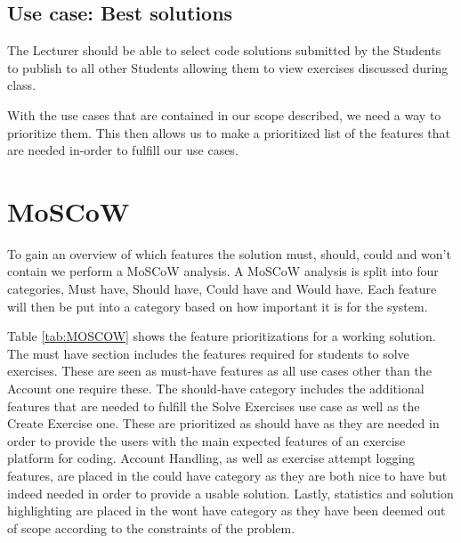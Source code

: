 \subsection*{Use case: Best solutions} 
The Lecturer should be able to select code solutions submitted by the Students to publish to all other Students allowing them to view exercises discussed during class.

With the use cases that are contained in our scope described, we need a way to prioritize them. This then allows us to make a prioritized list of the features that are needed in-order to fulfill our use cases. 

\section{MoSCoW}
To gain an overview of which features the solution must, should, could and won't contain we perform a MoSCoW analysis.
A MoSCoW analysis is split into four categories, Must have, Should have, Could have and Would have. Each feature will then be put into a category based on how important it is for the system. 

Table \ref{tab:MOSCOW} shows the feature prioritizations for a working solution. 
The must have section includes the features required for students to solve exercises. These are seen as must-have features as all use cases other than the Account one require these.  
The should-have category includes the additional features that are needed to fulfill the Solve Exercises use case as well as the Create Exercise one. 
These are prioritized as should have as they are needed in order to provide the users with the main expected features of an exercise platform for coding. 
Account Handling, as well as exercise attempt logging features, are placed in the could have category as they are both nice to have but indeed needed in order to provide a usable solution. 
Lastly, statistics and solution highlighting are placed in the wont have category as they have been deemed out of scope according to the constraints of the problem.


